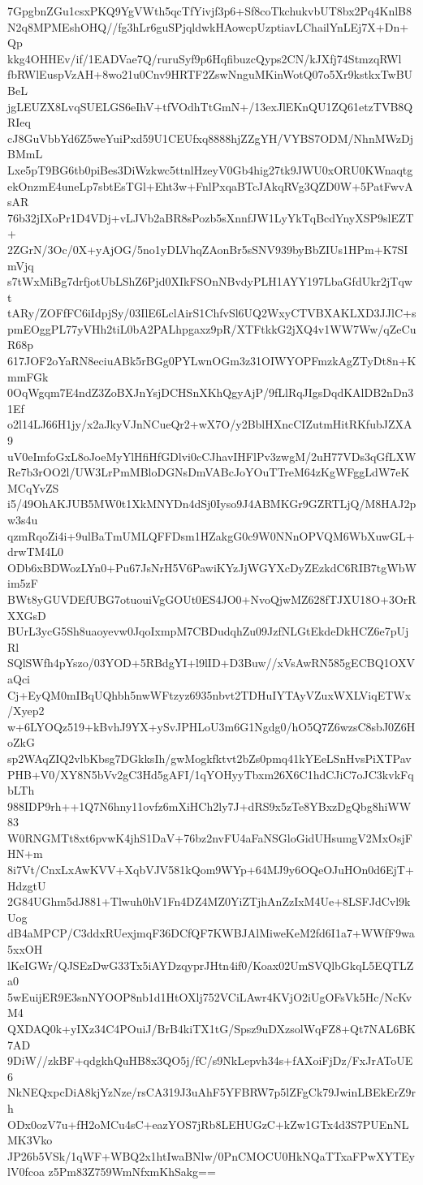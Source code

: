 7GpgbnZGu1csxPKQ9YgVWth5qcTfYivjf3p6+Sf8coTkchukvbUT8bx2Pq4KnlB8
N2q8MPMEshOHQ//fg3hLr6guSPjqldwkHAowcpUzptiavLChailYnLEj7X+Dn+Qp
kkg4OHHEv/if/1EADVae7Q/ruruSyf9p6HqfibuzcQyps2CN/kJXfj74StmzqRWl
fbRWlEuspVzAH+8wo21u0Cnv9HRTF2ZswNnguMKinWotQ07o5Xr9kstkxTwBUBeL
jgLEUZX8LvqSUELGS6eIhV+tfVOdhTtGmN+/13exJlEKnQU1ZQ61etzTVB8QRIeq
cJ8GuVbbYd6Z5weYuiPxd59U1CEUfxq8888hjZZgYH/VYBS7ODM/NhnMWzDjBMmL
Lxe5pT9BG6tb0piBes3DiWzkwc5ttnlHzeyV0Gb4hig27tk9JWU0xORU0KWnaqtg
ekOnzmE4uneLp7sbtEsTGl+Eht3w+FnlPxqaBTcJAkqRVg3QZD0W+5PatFwvAsAR
76b32jIXoPr1D4VDj+vLJVb2aBR8sPozb5sXnnfJW1LyYkTqBcdYnyXSP9slEZT+
2ZGrN/3Oc/0X+yAjOG/5no1yDLVhqZAonBr5sSNV939byBbZIUs1HPm+K7SImVjq
s7tWxMiBg7drfjotUbLShZ6Pjd0XIkFSOnNBvdyPLH1AYY197LbaGfdUkr2jTqwt
tARy/ZOFfFC6iIdpjSy/03IlE6LclAirS1ChfvSl6UQ2WxyCTVBXAKLXD3JJlC+s
pmEOggPL77yVHh2tiL0bA2PALhpgaxz9pR/XTFtkkG2jXQ4v1WW7Ww/qZeCuR68p
617JOF2oYaRN8eciuABk5rBGg0PYLwnOGm3z31OIWYOPFmzkAgZTyDt8n+KmmFGk
0OqWgqm7E4ndZ3ZoBXJnYsjDCHSnXKhQgyAjP/9fLlRqJIgsDqdKAlDB2nDn31Ef
o2l14LJ66H1jy/x2aJkyVJnNCueQr2+wX7O/y2BblHXncCIZutmHitRKfubJZXA9
uV0eImfoGxL8oJoeMyYlHfiHfGDlvi0cCJhavIHFlPv3zwgM/2uH77VDs3qGfLXW
Re7b3rOO2l/UW3LrPmMBloDGNsDmVABcJoYOuTTreM64zKgWFggLdW7eKMCqYvZS
i5/49OhAKJUB5MW0t1XkMNYDn4dSj0Iyso9J4ABMKGr9GZRTLjQ/M8HAJ2pw3s4u
qzmRqoZi4i+9ulBaTmUMLQFFDsm1HZakgG0c9W0NNnOPVQM6WbXuwGL+drwTM4L0
ODb6xBDWozLYn0+Pu67JsNrH5V6PawiKYzJjWGYXcDyZEzkdC6RIB7tgWbWim5zF
BWt8yGUVDEfUBG7otuouiVgGOUt0ES4JO0+NvoQjwMZ628fTJXU18O+3OrRXXGsD
BUrL3ycG5Sh8uaoyevw0JqoIxmpM7CBDudqhZu09JzfNLGtEkdeDkHCZ6e7pUjRl
SQlSWfh4pYszo/03YOD+5RBdgYI+l9lID+D3Buw//xVsAwRN585gECBQ1OXVaQci
Cj+EyQM0mIBqUQhbh5nwWFtzyz6935nbvt2TDHuIYTAyVZuxWXLViqETWx/Xyep2
w+6LYOQz519+kBvhJ9YX+ySvJPHLoU3m6G1Ngdg0/hO5Q7Z6wzsC8sbJ0Z6HoZkG
sp2WAqZIQ2vlbKbsg7DGkksIh/gwMogkfktvt2bZs0pmq41kYEeLSnHvsPiXTPav
PHB+V0/XY8N5bVv2gC3Hd5gAFI/1qYOHyyTbxm26X6C1hdCJiC7oJC3kvkFqbLTh
988IDP9rh++1Q7N6hny11ovfz6mXiHCh2ly7J+dRS9x5zTe8YBxzDgQbg8hiWW83
W0RNGMTt8xt6pvwK4jhS1DaV+76bz2nvFU4aFaNSGloGidUHsumgV2MxOsjFHN+m
8i7Vt/CnxLxAwKVV+XqbVJV581kQom9WYp+64MJ9y6OQeOJuHOn0d6EjT+HdzgtU
2G84UGhm5dJ881+Tlwuh0hV1Fn4DZ4MZ0YiZTjhAnZzIxM4Ue+8LSFJdCvl9kUog
dB4aMPCP/C3ddxRUexjmqF36DCfQF7KWBJAlMiweKeM2fd6I1a7+WWfF9wa5xxOH
lKeIGWr/QJSEzDwG33Tx5iAYDzqyprJHtn4if0/Koax02UmSVQlbGkqL5EQTLZa0
5wEuijER9E3snNYOOP8nb1d1HtOXlj752VCiLAwr4KVjO2iUgOFsVk5Hc/NcKvM4
QXDAQ0k+yIXz34C4POuiJ/BrB4kiTX1tG/Spsz9uDXzsolWqFZ8+Qt7NAL6BK7AD
9DiW//zkBF+qdgkhQuHB8x3QO5j/fC/s9NkLepvh34s+fAXoiFjDz/FxJrAToUE6
NkNEQxpcDiA8kjYzNze/rsCA319J3uAhF5YFBRW7p5lZFgCk79JwinLBEkErZ9rh
ODx0ozV7u+fH2oMCu4sC+eazYOS7jRb8LEHUGzC+kZw1GTx4d3S7PUEnNLMK3Vko
JP26b5VSk/1qWF+WBQ2x1htIwaBNlw/0PnCMOCU0HkNQaTTxaFPwXYTEylV0fcoa
z5Pm83Z759WmNfxmKhSakg==
